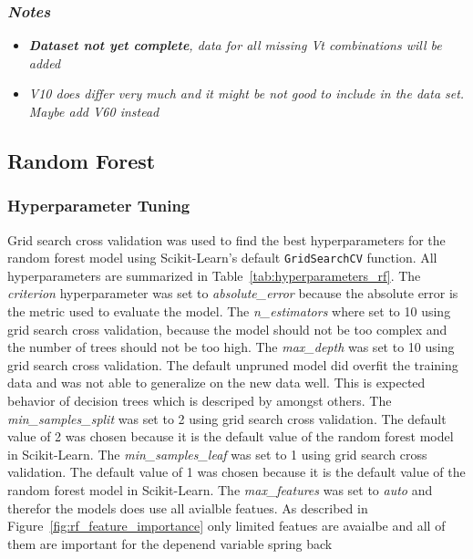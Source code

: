 \subsubsection*{\textit{Notes}}
\begin{itemize}
    \item \textit{\textbf{Dataset not yet complete}, data for all missing Vt combinations will be added}
    \item \textit{V10 does differ very much and it might be not good to include in the data set. Maybe add V60 instead}
\end{itemize}

\subsection{Random Forest}

\subsubsection*{Hyperparameter Tuning}
Grid search cross validation was used to find the best hyperparameters for the random forest model using
Scikit-Learn's default \texttt{GridSearchCV} function.
All hyperparameters are summarized in Table~\ref{tab:hyperparameters_rf}.
The \textit{criterion} hyperparameter was set to \textit{absolute\_error} because the absolute error is the metric
used to evaluate the model.
The \textit{n\_estimators} where set to 10 using grid search cross validation, because the model should not be too
complex and the number of trees should not be too high.
The \textit{max\_depth} was set to 10 using grid search cross validation. The default unpruned model did overfit the
training data and was not able to generalize on the new data well. This is expected behavior of decision trees which
is descriped by \cite[p. 133-136]{muller_introductionmachinelearning_2016} amongst others.
The \textit{min\_samples\_split} was set to 2 using grid search cross validation. The default value of 2 was chosen
because it is the default value of the random forest model in Scikit-Learn.
The \textit{min\_samples\_leaf} was set to 1 using grid search cross validation. The default value of 1 was chosen
because it is the default value of the random forest model in Scikit-Learn.
The \textit{max\_features} was set to \textit{auto} and therefor the models does use all avialble featues. As
described in Figure~\ref{fig:rf_feature_importance} only limited featues are avaialbe and all of them are important
for the depenend variable spring back

